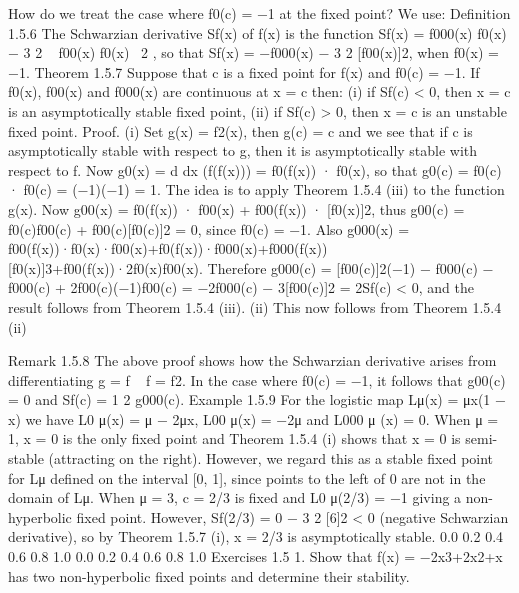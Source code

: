 \documentclass[12pt]{article}
\begin{document}
\begin{enumerate}
\begin{enumerate}
How do we treat the case where f0(c) = −1 at the fixed point? We use:
Definition 1.5.6 The Schwarzian derivative Sf(x) of f(x) is the function
Sf(x) =
f000(x)
f0(x)
−
3
2
 
f00(x)
f0(x)
 2
,
so that
Sf(x) = −f000(x) −
3
2
[f00(x)]2, when f0(x) = −1.
Theorem 1.5.7 Suppose that c is a fixed point for f(x) and f0(c) = −1. If f0(x),
f00(x) and f000(x) are continuous at x = c then:
(i) if Sf(c) < 0, then x = c is an asymptotically stable fixed point,
(ii) if Sf(c) > 0, then x = c is an unstable fixed point.
Proof. (i) Set g(x) = f2(x), then g(c) = c and we see that if c is asymptotically
stable with respect to g, then it is asymptotically stable with respect to f. Now
g0(x) =
d
dx
(f(f(x))) = f0(f(x)) · f0(x),
so that g0(c) = f0(c) · f0(c) = (−1)(−1) = 1.
The idea is to apply Theorem 1.5.4 (iii) to the function g(x). Now
g00(x) = f0(f(x)) · f00(x) + f00(f(x)) · [f0(x)]2,
thus
g00(c) = f0(c)f00(c) + f00(c)[f0(c)]2 = 0, since f0(c) = −1.
Also
g000(x) = f00(f(x))·f0(x)·f00(x)+f0(f(x))·f000(x)+f000(f(x))[f0(x)]3+f00(f(x))·2f0(x)f00(x).
Therefore
g000(c) = [f00(c)]2(−1) − f000(c) − f000(c) + 2f00(c)(−1)f00(c)
= −2f000(c) − 3[f00(c)]2
= 2Sf(c) < 0,
and the result follows from Theorem 1.5.4 (iii).
(ii) This now follows from Theorem 1.5.4 (ii)


Remark 1.5.8 The above proof shows how the Schwarzian derivative arises from
differentiating g = f   f = f2. In the case where f0(c) = −1, it follows that
g00(c) = 0 and Sf(c) =
1
2
g000(c).
Example 1.5.9 For the logistic map Lμ(x) = μx(1 − x) we have
L0
μ(x) = μ − 2μx, L00
μ(x) = −2μ and L000
μ (x) = 0.
When μ = 1, x = 0 is the only fixed point and Theorem 1.5.4 (i) shows that x = 0 is
semi-stable (attracting on the right). However, we regard this as a stable fixed point
for Lμ defined on the interval [0, 1], since points to the left of 0 are not in the domain
of Lμ.
When μ = 3, c = 2/3 is fixed and L0
μ(2/3) = −1 giving a non-hyperbolic fixed
point. However, Sf(2/3) = 0 − 3
2 [6]2 < 0 (negative Schwarzian derivative), so by
Theorem 1.5.7 (i), x = 2/3 is asymptotically stable.
0.0 0.2 0.4 0.6 0.8 1.0
0.0
0.2
0.4
0.6
0.8
1.0
Exercises 1.5
1. Show that f(x) = −2x3+2x2+x has two non-hyperbolic fixed points and determine
their stability.


\end{enumerate}
\end{enumerate}
\end{document}
